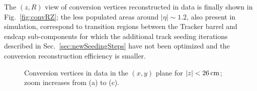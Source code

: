 \documentclass[a4paper]{jpconf}
\begin{document}
The  $(z, R)$  view of conversion vertices reconstructed in data is finally shown in Fig.~\ref{fig:convRZ};  the less populated
areas  around $|\eta|\sim1.2$, also present in simulation, correspond to transition regions between the Tracker
barrel and endcap sub-components for which the additional track seeding
iterations described in Sec.~\ref{sec:newSeedingSteps} have not been optimized and the conversion reconstruction efficiency is smaller.

\begin{figure}[h!]
  \begin{center}
   \vspace{-0.6cm}
    \caption{Conversion vertices in data in the $(x,y)$ plane for $|z|<26\rm \, cm$; zoom increases from (a) to (c).}
    \label{fig:convXY}
  \end{center}
\end{figure}
\end{document}
